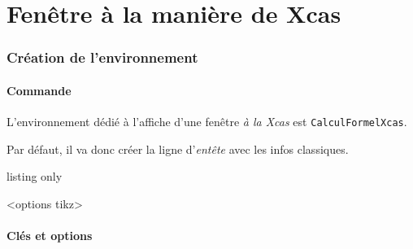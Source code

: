 \documentclass[french,a4paper,11pt]{article}
\begin{document}
\pagebreak

\part{Fenêtre à la manière de Xcas}

\section{Création de l'environnement}

\subsection{Commande}

\begin{cautionblock}
L'environnement dédié à l'affiche d'une fenêtre \textit{à la Xcas} est \texttt{CalculFormelXcas}.

Par défaut, il va donc créer la ligne d'\textit{entête} avec les infos classiques.
\end{cautionblock}

\begin{PresentationCode}{listing only}
\begin{CalculFormelXcas}<options tikz>
\end{CalculFormelXcas}
\end{PresentationCode}

\begin{PresentationCode}{}
\begin{CalculFormelXcas}
\end{CalculFormelXcas}
\end{PresentationCode}

\subsection{Clés et options}
\end{document}
